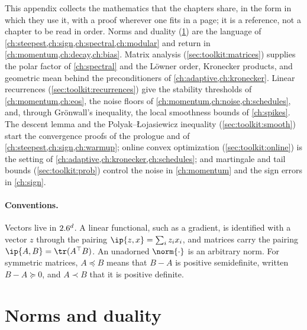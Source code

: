 \begin{refsection}

This appendix collects the mathematics that the chapters share, in the form in which they use it, with a proof wherever one fits in a page; it is a reference, not a chapter to be read in order. Norms and duality (\cref{sec:toolkit:duality}) are the language of \cref{ch:steepest,ch:sign,ch:spectral,ch:modular} and return in \cref{ch:momentum,ch:decay,ch:bias}. Matrix analysis (\cref{sec:toolkit:matrices}) supplies the polar factor of \cref{ch:spectral} and the L\"owner order, Kronecker products, and geometric mean behind the preconditioners of \cref{ch:adaptive,ch:kronecker}. Linear recurrences (\cref{sec:toolkit:recurrences}) give the stability thresholds of \cref{ch:momentum,ch:eos}, the noise floors of \cref{ch:momentum,ch:noise,ch:schedules}, and, through Gr\"onwall's inequality, the local smoothness bounds of \cref{ch:spikes}. The descent lemma and the Polyak--\L{}ojasiewicz inequality (\cref{sec:toolkit:smooth}) start the convergence proofs of the prologue and of \cref{ch:steepest,ch:sign,ch:warmup}; online convex optimization (\cref{sec:toolkit:online}) is the setting of \cref{ch:adaptive,ch:kronecker,ch:schedules}; and martingale and tail bounds (\cref{sec:toolkit:prob}) control the noise in \cref{ch:momentum} and the sign errors in \cref{ch:sign}.

\paragraph{Conventions.} Vectors live in $2.6^d$. A linear functional, such as a gradient, is identified with a vector $z$ through the pairing $\ip{z,x}=\sum_iz_ix_i$, and matrices carry the pairing $\ip{A,B}=\tr(A^\top B)$. An unadorned $\norm{\cdot}$ is an arbitrary norm. For symmetric matrices, $A\preceq B$ means that $B-A$ is positive semidefinite, written $B-A\succeq0$, and $A\prec B$ that it is positive definite.

\section{Norms and duality}\label{sec:toolkit:duality}


\end{refsection}
